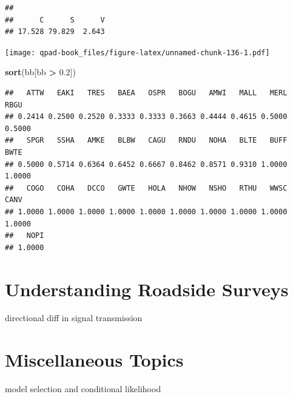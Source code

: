 \documentclass[12pt,]{book}
\newenvironment{Shaded}{\begin{snugshade}}{\end{snugshade}}
\newcommand{\FloatTok}[1]{\textcolor[rgb]{0.00,0.00,0.81}{#1}}
\newcommand{\KeywordTok}[1]{\textcolor[rgb]{0.13,0.29,0.53}{\textbf{#1}}}
\newcommand{\NormalTok}[1]{#1}
\newcommand{\OperatorTok}[1]{\textcolor[rgb]{0.81,0.36,0.00}{\textbf{#1}}}
\newcommand{\StringTok}[1]{\textcolor[rgb]{0.31,0.60,0.02}{#1}}
\begin{document}
\begin{verbatim}
## 
##      C      S      V 
## 17.528 79.829  2.643
\end{verbatim}

\begin{Shaded}
\end{Shaded}

\texttt{[image: qpad-book\_files/figure-latex/unnamed-chunk-136-1.pdf]}

\begin{Shaded}
\begin{Highlighting}[]
\KeywordTok{sort}\NormalTok{(bb[bb }\OperatorTok{>}\StringTok{ }\FloatTok{0.2}\NormalTok{])}
\end{Highlighting}
\end{Shaded}

\begin{verbatim}
##   ATTW   EAKI   TRES   BAEA   OSPR   BOGU   AMWI   MALL   MERL   RBGU 
## 0.2414 0.2500 0.2520 0.3333 0.3333 0.3663 0.4444 0.4615 0.5000 0.5000 
##   SPGR   SSHA   AMKE   BLBW   CAGU   RNDU   NOHA   BLTE   BUFF   BWTE 
## 0.5000 0.5714 0.6364 0.6452 0.6667 0.8462 0.8571 0.9310 1.0000 1.0000 
##   COGO   COHA   DCCO   GWTE   HOLA   NHOW   NSHO   RTHU   WWSC   CANV 
## 1.0000 1.0000 1.0000 1.0000 1.0000 1.0000 1.0000 1.0000 1.0000 1.0000 
##   NOPI 
## 1.0000
\end{verbatim}

\hypertarget{roadsides}{%
\chapter{Understanding Roadside Surveys}\label{roadsides}}

directional diff in signal transmission

\hypertarget{extras}{%
\chapter{Miscellaneous Topics}\label{extras}}

model selection and conditional likelihood
\end{document}
